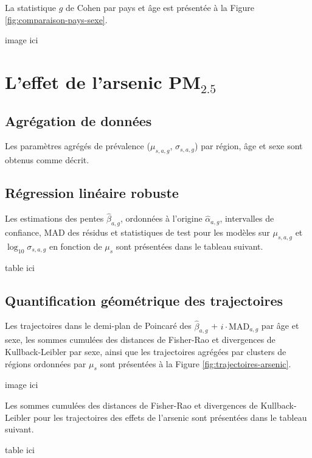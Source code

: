 La statistique $g$ de Cohen par pays et âge est présentée à la Figure \ref{fig:comparaison-pays-sexe}.

image ici

\section{L'effet de l'arsenic PM$_{2.5}$}

\subsection{Agrégation de données}

Les paramètres agrégés de prévalence ($\mu_{s,a,g}$, $\sigma_{s,a,g}$) par région, âge et sexe sont obtenus comme décrit.

\subsection{Régression linéaire robuste}

Les estimations des pentes $\hat{\beta}_{a,g}$, ordonnées à l'origine $\hat{\alpha}_{a,g}$, intervalles de confiance, MAD des résidus et statistiques de test pour les modèles sur $\mu_{s,a,g}$ et $\log_{10} \sigma_{s,a,g}$ en fonction de $\mu_s$ sont présentées dans le tableau suivant.

%
table ici

\subsection{Quantification géométrique des trajectoires}

Les trajectoires dans le demi-plan de Poincaré des $\hat{\beta}_{a,g}$ + $i \cdot \mathrm{MAD}_{a,g}$ par âge et sexe, les sommes cumulées des distances de Fisher-Rao et divergences de Kullback-Leibler par sexe, ainsi que les trajectoires agrégées par clusters de régions ordonnées par $\mu_s$ sont présentées à la Figure \ref{fig:trajectoires-arsenic}.

image ici

Les sommes cumulées des distances de Fisher-Rao et divergences de Kullback-Leibler pour les trajectoires des effets de l'arsenic sont présentées dans le tableau suivant.

%
table ici